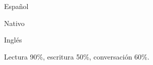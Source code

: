 
\begin{cvskills}

  \cvskill
    {\begin{minipage}[t]{0.1\linewidth}Español\end{minipage}} %
    {\begin{minipage}[t]{0.75\linewidth}Nativo\end{minipage}} %

  \cvskill
    {\begin{minipage}[t]{0.1\linewidth}Inglés\end{minipage}} %
    {\begin{minipage}[t]{0.75\linewidth}Lectura 90\%, escritura 50\%, conversación 60\%.\end{minipage}} %
    
\end{cvskills}
